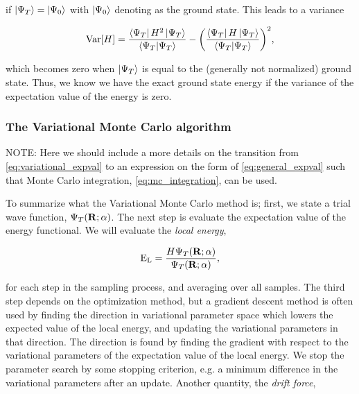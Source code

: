 if $\ket{\Psi_T}=\ket{\Psi_0}$ with $\ket{\Psi_0}$ denoting as the ground state. This leads to a variance

\begin{equation}\label{eq:variational_variance}
    \mathrm{Var}[H] = \frac{\bra{\Psi_T}H^2\ket{\Psi_T}}{\braket{\Psi_T}} -\qty(\frac{\bra{\Psi_T}H\ket{\Psi_T}}{\braket{\Psi_T}})^2,
\end{equation}

which becomes zero when $\ket{\Psi_T}$ is equal to the (generally not normalized) ground state. Thus, we know we have the exact ground state energy if the variance of the expectation value of the energy is zero. 


\subsubsection{The Variational Monte Carlo algorithm}

NOTE: Here we should include a more details on the transition from \autoref{eq:variational_expval} to an expression on the form of \autoref{eq:general_expval} such that Monte Carlo integration, \autoref{eq:mc_integration}, can be used. 

To summarize what the Variational Monte Carlo method is; first, we state a trial wave function, $\Psi_T(\vb{R}; \alpha)$. The next step is evaluate the expectation value of the energy functional. We will evaluate the \textit{local energy},

\begin{equation}\label{eq:local_energy}
    \mathrm{E}_{\mathrm{L}} = \frac{H\Psi_T(\vb{R};\alpha)}{\Psi_T(\vb{R};\alpha)},
\end{equation}

for each step in the sampling process, and averaging over all samples. 
The third step depends on the optimization method, but a gradient descent method is often used by finding the direction in variational parameter space which lowers the expected value of the local energy, and updating the variational parameters in that direction. The direction is found by finding the gradient with respect to the variational parameters of the expectation value of the local energy. We stop the parameter search by some stopping criterion, e.g. a minimum difference in the variational parameters after an update. 
Another quantity, the \textit{drift force},  

